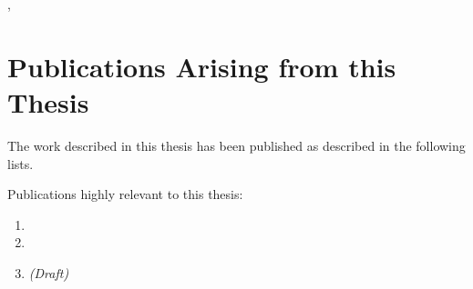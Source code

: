 

\vspace*{4cm}
\me{}, \pubyear{}


%
\chapter*{Publications Arising from this Thesis}
\vspace{-0.5cm}


The work described in this thesis has been published as described in the following lists.

Publications highly relevant to this thesis:
\begin{enumerate}
  \item {}
  \item {}
  \item {} \textit{(Draft)}
\end{enumerate}

